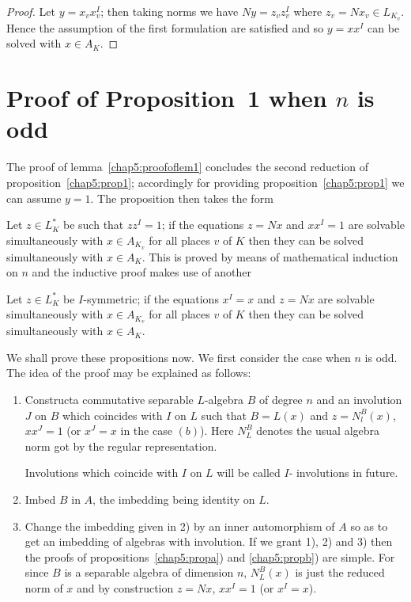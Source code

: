 \begin{proof}
Let $y = x_vx_v^{I}$; then taking norms we have $Ny=z_vz_v^I$ where
$z_v=Nx_v \in L_{K_v}$. Hence the assumption of the first formulation
are satisfied and so $y=xx^{I}$ can be solved with $x \in A_K$. 
\end{proof}


\section{Proof of Proposition~1 
when $n$ is odd}\label{chap5:sec5.6}

The proof of lemma~\ref{chap5:proofoflem1} concludes the second reduction 
of proposition~\ref{chap5:prop1}; accordingly for providing proposition~\ref{chap5:prop1} we can assume $y =
1$. The proposition then takes the form 

\begin{propa}\label{chap5:propa}
Let $z \in L_K^*$ be such that $zz^{I} = 1$; if the equations $z = Nx$
and $xx^I = 1$ are solvable simultaneously with $x \in A_{K_v}$ for
all places $v$ of $K$ then they can be solved simultaneously with $x
\in A_K$. This is proved by means of mathematical induction on $n$ and
the inductive proof makes use of another 
\end{propa}

\begin{propa}\label{chap5:propb}
Let $z \in L_K^*$ be $I$-symmetric; if the equations $x^I=x$ and
$z=Nx$ are solvable simultaneously with $x \in A_{K_v}$ for all places
$v$ of $K$ then they can be solved simultaneously with $x \in A_K$. 

We shall prove these propositions now. We first consider the case when
$n$ is odd. The idea of the proof may be explained as follows: 
\begin{enumerate}
\renewcommand{\labelenumi}{\theenumi)}
\item Construct\pageoriginale a commutative separable $L$-algebra $B$
of degree $n$ and an involution $J$ on $B$ which coincides with $I$ on
$L$ such that 
$B=L(x)$ and $z=N_l^B(x)$, $xx^J=1$ (or $x^J=x$ in the case $(b)$). Here
$N_L^B$ denotes the usual algebra norm got by the regular
representation. 

Involutions which coincide with $I$ on $L$ will be called $I$-
involutions in future. 

\item Imbed $B$ in $A$, the imbedding being identity on $L$.

\item Change the imbedding given in 2) by an inner automorphism of $A$
so as to get an imbedding of algebras with involution. If we grant
1), 2) and 3) then the proofs of propositions~\ref{chap5:propa}) and \ref{chap5:propb}) are
simple. For since $B$ is a separable algebra of dimension $n$,
$N_L^B(x)$ is just the reduced norm of $x$ and by construction $z = Nx$,
$xx^I = 1$ (or $x^I = x$). 
\end{enumerate}
\end{propa}

